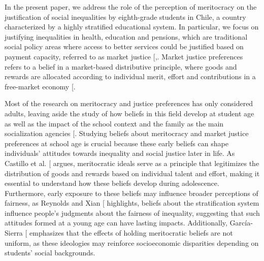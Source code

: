 \documentclass[
  12pt,
  letterpaper,
]{article}
\begin{document}
In the present paper, we address the role of the perception of
meritocracy on the justification of social inequalities by eighth-grade
students in Chile, a country characterized by a highly stratified
educational system. In particular, we focus on justifying inequalities
in health, education and pensions, which are traditional social policy
areas where access to better services could be justified based on
payment capacity, referred to as market justice
{[},\citeproc{ref-lindh_bringing_2023}{10}{]}.
Market justice preferences refers to a belief in a market-based
distributive principle, where goods and rewards are allocated according
to individual merit, effort and contributions in a free-market economy
{[}\citeproc{ref-lindh_public_2015}{11}{]}.

Most of the research on meritocracy and justice preferences has only
considered adults, leaving aside the study of how beliefs in this field
develop at student age as well as the impact of the school context and
the family as the main socialization agencies
{[}\citeproc{ref-batruch_belief_2022}{3}{]}. Studying beliefs about
meritocracy and market justice preferences at school age is crucial
because these early beliefs can shape individuals' attitudes towards
inequality and social justice later in life. As Castillo et al.
{[}\citeproc{ref-castillo_meritocracia_2019}{12}{]} argues, meritocratic
ideals serve as a principle that legitimizes the distribution of goods
and rewards based on individual talent and effort, making it essential
to understand how these beliefs develop during adolescence. Furthermore,
early exposure to these beliefs may influence broader perceptions of
fairness, as Reynolds and Xian
{[}\citeproc{ref-reynolds_perceptions_2014}{13}{]} highlights, beliefs
about the stratification system influence people's judgments about the
fairness of inequality, suggesting that such attitudes formed at a young
age can have lasting impacts. Additionally, García-Sierra
{[}\citeproc{ref-garcia-sierra_dark_2023}{14}{]} emphasizes that the
effects of holding meritocratic beliefs are not uniform, as these
ideologies may reinforce socioeconomic disparities depending on
students' social backgrounds.
\end{document}
